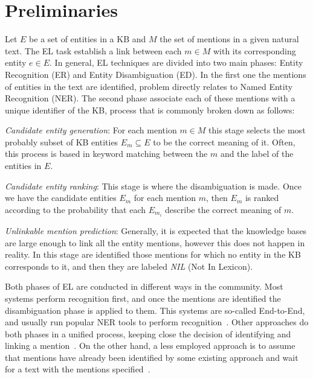 \documentclass{llncs}
\begin{document}
\section{Preliminaries}
\label{subsect:preliminaries}

Let $E$ be a set of entities in a KB and $M$ the set of mentions in a given natural text. The EL task establish a link between each $m\in{}M$ with its corresponding entity $e\in{}E$. In general, EL techniques are divided into two main phases: Entity Recognition (ER) and Entity Disambiguation (ED). In the first one the mentions of entities in the text are identified, problem directly relates to Named Entity Recognition (NER). The second phase associate each of these mentions with a unique identifier of the KB, process that is commonly broken down as follows:

\begin{description}
\item \textit{Candidate entity generation}:
For each mention $m\in{}M$ this stage selects the most probably subset of KB entities $E_m \subseteq E$ to be the correct meaning of it. Often, this process is based in keyword matching between the $m$ and the label of the entities in $E$.

\item \textit{Candidate entity ranking}: This stage is where the disambiguation is made. Once we have the candidate entities $E_m$ for each mention $m$, then $E_m$ is ranked according to the probability that each $ E_{m_i} $ describe the correct meaning of $m$.

\item \textit{Unlinkable mention prediction}:
Generally, it is expected that the knowledge bases are large enough to link all the entity mentions, however this does not happen in reality. In this stage are identified those mentions for which no entity in the KB corresponds to it, and then they are labeled \textit{NIL} (Not In Lexicon). 
\end{description}

Both phases of EL are conducted in different ways in the community. Most systems perform recognition first, and once the mentions are identified the disambiguation phase is applied to them. This systems are so-called End-to-End, and usually run popular NER tools to perform recognition~\cite{mendes2011dbpedia,Babelfy-moro2014entity}. Other approaches do both phases in a unified process, keeping close the decision of identifying and linking a mention~\cite{joinapproach2015}. On the other hand, a less employed approach is to assume that mentions have already been identified by some existing approach and wait for a text with the mentions specified~\cite{mag2017}.
\end{document}
